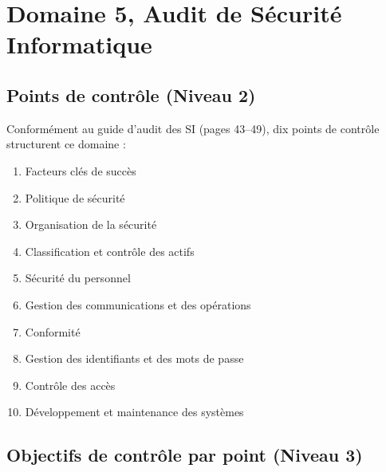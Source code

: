 \section{Domaine 5, Audit de Sécurité Informatique}
\label{sec:decomp-securite}

\subsection{Points de contrôle (Niveau 2)}

Conformément au guide d'audit des SI (pages 43--49), dix points de contrôle structurent ce domaine :

\begin{enumerate}
    \item Facteurs clés de succès
    \item Politique de sécurité
    \item Organisation de la sécurité
    \item Classification et contrôle des actifs
    \item Sécurité du personnel
    \item Gestion des communications et des opérations
    \item Conformité
    \item Gestion des identifiants et des mots de passe
    \item Contrôle des accès
    \item Développement et maintenance des systèmes
\end{enumerate}

\subsection{Objectifs de contrôle par point (Niveau 3)}

